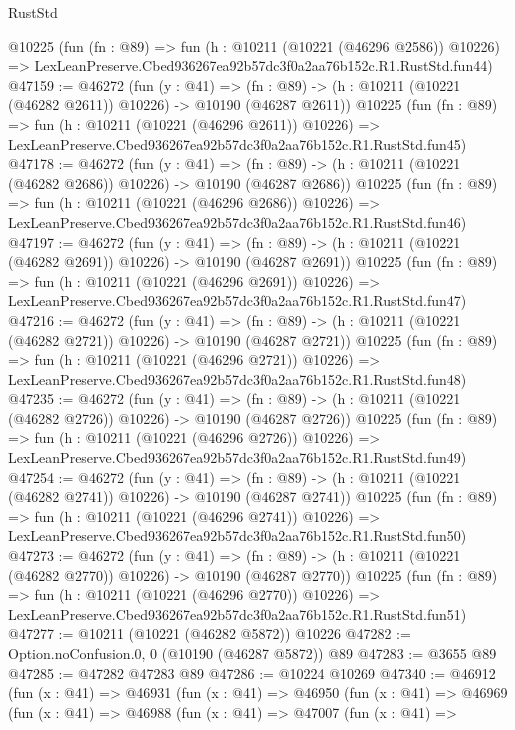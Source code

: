 \begin{lexlean}{RustStd}
\begin{coremodule}
    @10225
    (fun (fn : @89) =>
    fun (h : @10211 (@10221 (@46296 @2586)) @10226) =>
    LexLeanPreserve.Cbed936267ea92b57dc3f0a2aa76b152c.R1.RustStd.fun44)
@47159 := @46272
    (fun (y : @41) =>
    (fn : @89) -> (h : @10211 (@10221 (@46282 @2611)) @10226) -> @10190 (@46287 @2611))
    @10225
    (fun (fn : @89) =>
    fun (h : @10211 (@10221 (@46296 @2611)) @10226) =>
    LexLeanPreserve.Cbed936267ea92b57dc3f0a2aa76b152c.R1.RustStd.fun45)
@47178 := @46272
    (fun (y : @41) =>
    (fn : @89) -> (h : @10211 (@10221 (@46282 @2686)) @10226) -> @10190 (@46287 @2686))
    @10225
    (fun (fn : @89) =>
    fun (h : @10211 (@10221 (@46296 @2686)) @10226) =>
    LexLeanPreserve.Cbed936267ea92b57dc3f0a2aa76b152c.R1.RustStd.fun46)
@47197 := @46272
    (fun (y : @41) =>
    (fn : @89) -> (h : @10211 (@10221 (@46282 @2691)) @10226) -> @10190 (@46287 @2691))
    @10225
    (fun (fn : @89) =>
    fun (h : @10211 (@10221 (@46296 @2691)) @10226) =>
    LexLeanPreserve.Cbed936267ea92b57dc3f0a2aa76b152c.R1.RustStd.fun47)
@47216 := @46272
    (fun (y : @41) =>
    (fn : @89) -> (h : @10211 (@10221 (@46282 @2721)) @10226) -> @10190 (@46287 @2721))
    @10225
    (fun (fn : @89) =>
    fun (h : @10211 (@10221 (@46296 @2721)) @10226) =>
    LexLeanPreserve.Cbed936267ea92b57dc3f0a2aa76b152c.R1.RustStd.fun48)
@47235 := @46272
    (fun (y : @41) =>
    (fn : @89) -> (h : @10211 (@10221 (@46282 @2726)) @10226) -> @10190 (@46287 @2726))
    @10225
    (fun (fn : @89) =>
    fun (h : @10211 (@10221 (@46296 @2726)) @10226) =>
    LexLeanPreserve.Cbed936267ea92b57dc3f0a2aa76b152c.R1.RustStd.fun49)
@47254 := @46272
    (fun (y : @41) =>
    (fn : @89) -> (h : @10211 (@10221 (@46282 @2741)) @10226) -> @10190 (@46287 @2741))
    @10225
    (fun (fn : @89) =>
    fun (h : @10211 (@10221 (@46296 @2741)) @10226) =>
    LexLeanPreserve.Cbed936267ea92b57dc3f0a2aa76b152c.R1.RustStd.fun50)
@47273 := @46272
    (fun (y : @41) =>
    (fn : @89) -> (h : @10211 (@10221 (@46282 @2770)) @10226) -> @10190 (@46287 @2770))
    @10225
    (fun (fn : @89) =>
    fun (h : @10211 (@10221 (@46296 @2770)) @10226) =>
    LexLeanPreserve.Cbed936267ea92b57dc3f0a2aa76b152c.R1.RustStd.fun51)
@47277 := @10211 (@10221 (@46282 @5872)) @10226
@47282 := Option.noConfusion.{0, 0} (@10190 (@46287 @5872)) @89
@47283 := @3655 @89
@47285 := @47282 @47283 @89
@47286 := @10224 @10269
@47340 := @46912
    (fun (x : @41) =>
    @46931
      (fun (x : @41) =>
      @46950
        (fun (x : @41) =>
        @46969
          (fun (x : @41) =>
          @46988
            (fun (x : @41) =>
            @47007
              (fun (x : @41) =>

\end{coremodule}
\end{lexlean}
